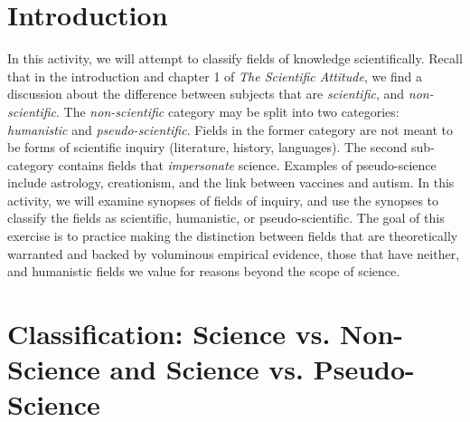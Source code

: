 \documentclass[12pt]{article}
\begin{document}
\maketitle

\section{Introduction}

In this activity, we will attempt to classify fields of knowledge scientifically.  Recall that in the introduction and chapter 1 of \textit{The Scientific Attitude}, we find a discussion about the difference between subjects that are \textit{scientific}, and \textit{non-scientific}.  The \textit{non-scientific} category may be split into two categories: \textit{humanistic} and \textit{pseudo-scientific}.  Fields in the former category are not meant to be forms of scientific inquiry (literature, history, languages).  The second sub-category contains fields that \textit{impersonate} science.  Examples of pseudo-science include astrology, creationism, and the link between vaccines and autism.  In this activity, we will examine synopses of fields of inquiry, and use the synopses to classify the fields as scientific, humanistic, or pseudo-scientific.  The goal of this exercise is to practice making the distinction between fields that are theoretically warranted and backed by voluminous empirical evidence, those that have neither, and humanistic fields we value for reasons beyond the scope of science.

\section{Classification: Science vs. Non-Science and Science vs. Pseudo-Science}
\end{document}
